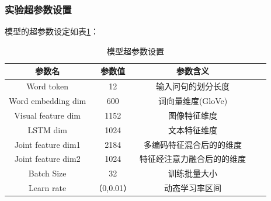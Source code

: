 \subsubsection*{实验超参数设置}
模型的超参数设定如表\ref{tab:su_para}：
\begin{table}
	\centering
	\caption{\label{tab:su_para}模型超参数设置}
	\small
	\begin{tabular}{ccccc}
		\hline
		参数名 & 参数值 & 参数含义 \\
		\hline Word token & 12 & 输入问句的划分长度 \\
		Word embedding dim & 600 & 词向量维度(GloVe) \\
		Visual feature dim & 1152 & 图像特征维度 \\
		LSTM dim & 1024 & 文本特征维度 \\
		Joint feature dim1 & 2184 & 多编码特征混合后的的维度 \\
		Joint feature dim2 & 1024 & 特征经注意力融合后的的维度 \\
		Batch Size & 32 & 训练批量大小 \\
		Learn rate & （0,0.01） & 动态学习率区间 \\
		\hline
	\end{tabular}
\end{table}


